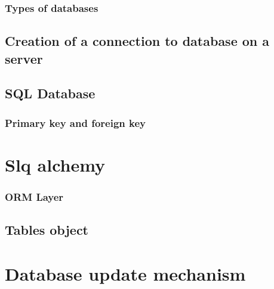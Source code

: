 \documentclass[../main.tex]{subfiles}
\begin{document}
\subsubsection{Types of databases}
\subsection{Creation of a connection to database on a server}
\subsection{SQL Database}
\subsubsection{Primary key and foreign key}
\section{Slq alchemy}
\subsubsection{ORM Layer}
\subsection{Tables object}
\section{Database update mechanism}
\cleardoublepage
\end{document}
